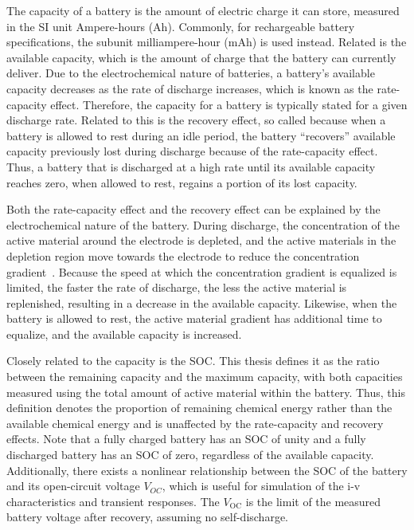 \documentclass[../zhang_thesis.tex]{subfiles}
\begin{document}
The capacity of a battery is the amount of electric charge it can store, measured in the SI unit Ampere-hours (Ah). Commonly, for rechargeable battery specifications, the subunit milliampere-hour (mAh) is used instead. Related is the available capacity, which is the amount of charge that the battery can currently deliver. Due to the electrochemical nature of batteries, a battery's available capacity decreases as the rate of discharge increases, which is known as the rate-capacity effect. Therefore, the capacity for a
battery is typically stated for a given discharge rate.  Related to this is the recovery effect, so called because when a battery is allowed to rest during an idle period, the battery ``recovers'' available capacity previously lost during discharge because of the rate-capacity effect. Thus, a battery that is discharged at a high rate until its available capacity reaches zero, when allowed to rest, regains a portion of its lost capacity.

Both the rate-capacity effect and the recovery effect can be explained by the electrochemical nature of the battery. During discharge, the concentration of the active material around the electrode is depleted, and the active materials in the depletion region move towards the electrode to reduce the concentration gradient~\cite{chiasserini99}. Because the speed at which the concentration gradient is equalized is limited, the faster the rate of discharge, the less the active material is
replenished, resulting in a decrease in the available capacity. Likewise, when the battery is allowed to rest, the active material gradient has additional time to equalize, and the available capacity is increased.

Closely related to the capacity is the SOC. This thesis defines it as the ratio between the remaining capacity and the maximum capacity, with both capacities measured using the total amount of active material within the battery. Thus, this definition denotes the proportion of remaining chemical energy rather than the available chemical energy and is unaffected by the rate-capacity and recovery effects. Note that a fully charged battery has an SOC of unity and a fully discharged battery has an SOC of zero, regardless
of the available capacity. Additionally, there exists a nonlinear relationship between the SOC of the battery and its open-circuit voltage $V_{OC}$, which is useful for simulation of the i-v characteristics and transient responses. The $V_\text{OC}$ is the limit of the measured battery voltage after recovery, assuming no self-discharge.
\end{document}
